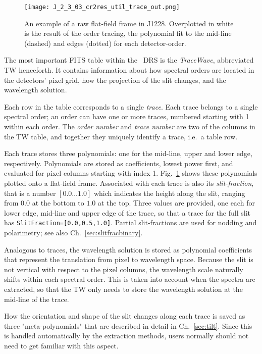 \begin{figure}[!tb]
    \begin{center}
      \texttt{[image: J\_2\_3\_03\_cr2res\_util\_trace\_out.png]}
    \end{center}
    \caption{
      \label{fig:flat_trace}
      An example of a raw flat-field frame in J1228. Overplotted in white is 
      the result of the order tracing, the polynomial fit to the mid-line
      (dashed) and edges (dotted) for each detector-order.
      }
  \end{figure}

The most important FITS table within the \instrument\ DRS is the
\emph{TraceWave}, abbreviated TW henceforth. It contains information about how
spectral orders are located in the detectors' pixel grid, how the projection of
the slit changes, and the wavelength solution.

Each row in the table corresponds to a single \emph{trace}. Each trace belongs
to a single spectral order; an order can have one or more traces, numbered
starting with 1 within each order. The \emph{order number} and \emph{trace
number} are two of the columns in the TW table, and together they uniquely
identify a trace, i.e.~a table row.

Each trace stores three polynomials: one for the mid-line, upper and lower edge,
respectively. Polynomials are stored as coefficients, lowest power first, and
evaluated for pixel columns starting with index 1. Fig.~\ref{fig:flat_trace}
shows these polynomials plotted onto a flat-field frame. Associated with each
trace is also its \emph{slit-fraction}, that is a number $[0.0\ldots 1.0]$ which
indicates the height along the slit, ranging from $0.0$ at the bottom to $1.0$
at the top. Three values are provided, one each for lower edge, mid-line and
upper edge of the trace, so that a trace for the full slit has
\verb!SlitFraction=[0.0,0.5,1.0]!. Partial slit-fractions are used for nodding
and polarimetry; see also Ch.~\ref{sec:slitfracbinary}.

Analogous to traces, the wavelength solution is stored as polynomial coefficients
that represent the translation from pixel to wavelength space. Because the slit
is not vertical with respect to the pixel columns, the wavelength scale
naturally shifts within each spectral order. This is taken into account when the
spectra are extracted, so that the TW only needs to store the wavelength
solution at the mid-line of the trace.

How the orientation and shape of the slit changes along each trace is saved as
three "meta-polynomials" that are described in detail in Ch.~\ref{sec:tilt}.
Since this is handled automatically by the extraction methods, users normally
should not need to get familiar with this aspect.

